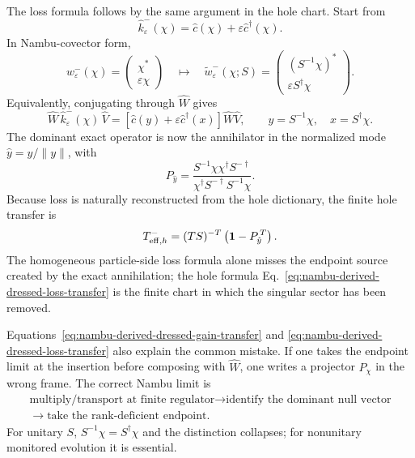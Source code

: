 \documentclass[aps,prb,onecolumn,nofootinbib,superscriptaddress]{revtex4-2}
\newcommand{\I}{\mathbf{1}}
\theoremstyle{plain}
\theoremstyle{definition}
\begin{document}
The loss formula follows by the same argument in the hole chart.  Start from
\begin{equation}
  \hat k_\varepsilon^-(\chi)
  =
  \hat c(\chi)+\varepsilon\hat c^\dagger(\chi).
  \label{eq:single-copy-loss-regulator}
\end{equation}
In Nambu-covector form,
\begin{equation}
  w_\varepsilon^-(\chi)
  =
  \begin{pmatrix}
    \chi^*\\
    \varepsilon\chi
  \end{pmatrix}
  \quad\longmapsto\quad
  \widetilde w_\varepsilon^-(\chi;S)
  =
  \begin{pmatrix}
    (S^{-1}\chi)^*\\
    \varepsilon S^\dagger\chi
  \end{pmatrix}.
  \label{eq:nambu-transported-loss-covector}
\end{equation}
Equivalently, conjugating through \(\hat W\) gives
\begin{equation}
  \hat W\,\hat k_\varepsilon^-(\chi)\,\hat V
  =
  \left[
    \hat c(y)+\varepsilon\hat c^\dagger(x)
  \right]\hat W\hat V,
  \qquad
  y=S^{-1}\chi,\quad x=S^\dagger\chi .
  \label{eq:transported-loss-regulator}
\end{equation}
The dominant exact operator is now the annihilator in the normalized mode
\(\hat y=y/\|y\|\), with
\begin{equation}
  P_{\hat y}
  =
  \frac{S^{-1}\chi\chi^\dagger S^{-\dagger}}
       {\chi^\dagger S^{-\dagger}S^{-1}\chi}.
  \label{eq:dressed-loss-projector-nambu}
\end{equation}
Because loss is naturally reconstructed from the hole dictionary, the finite
hole transfer is
\begin{equation}
  T_{{\rm eff},h}^{-}
  =
  (TS)^{-T}\left(\I-P_{\hat y}^{\,T}\right).
  \label{eq:nambu-derived-dressed-loss-transfer}
\end{equation}
The homogeneous particle-side loss formula alone misses the endpoint source
created by the exact annihilation; the hole formula
Eq.~\eqref{eq:nambu-derived-dressed-loss-transfer} is the finite chart in
which the singular sector has been removed.

Equations~\eqref{eq:nambu-derived-dressed-gain-transfer} and
\eqref{eq:nambu-derived-dressed-loss-transfer} also explain the common
mistake.  If one takes the endpoint limit at the insertion before composing
with \(\hat W\), one writes a projector \(P_\chi\) in the wrong frame.  The
correct Nambu limit is
\begin{equation}
\begin{gathered}
  \text{multiply/transport at finite regulator}
  \longrightarrow
  \text{identify the dominant null vector}
  \\
  \longrightarrow
  \text{take the rank-deficient endpoint}.
\end{gathered}
\label{eq:correct-nambu-limit-order}
\end{equation}
For unitary \(S\), \(S^{-1}\chi=S^\dagger\chi\) and the distinction collapses;
for nonunitary monitored evolution it is essential.
\end{document}
